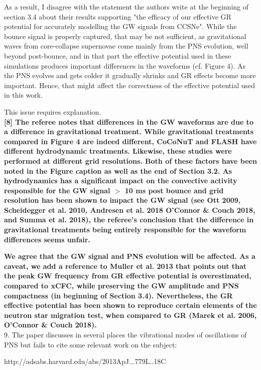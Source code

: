 \documentclass[11pt]{article}
\begin{document}
As a result, I disagree with the statement the authors write at the beginning of 
section 3.4 about their results supporting "the efficacy of our effective GR 
potential for accurately modelling the GW signals from CCSNe". While the bounce signal is properly captured, that may be not sufficient, as gravitational waves from core-collapse supernovae come mainly from the PNS evolution, well beyond post-bounce, and in that part the effective potential used in these simulations produces important differences in the waveforms (cf. Figure 4). As the PNS evolves and gets colder it gradually shrinks and GR effects become more important. Hence, that might affect the correctness of the effective potential used in this work.

This issue requires explanation.\\

\textbf{[8] The referee notes that differences in the GW waveforms are due to a difference in gravitational treatment.  While gravitational treatments compared in Figure 4 are indeed different, CoCoNuT and FLASH have different hydrodynamic treatments.  Likewise, these studies were performed at different grid resolutions.  Both of these factors have been noted in the Figure caption as well as the end of Section 3.2.  As hydrodynamics has a significant impact on the convective activity responsible for the GW signal $>$ 10 ms post bounce and grid resolution has been shown to impact the GW signal (see Ott 2009, Scheidegger et al. 2010, Andresen et al. 2018 O'Connor \& Couch 2018, and Summa et al. 2018), the referee's conclusion that the difference in gravitational treatments being entirely responsible for the waveform differences seems unfair.}

\textbf{We agree that the GW signal and PNS evolution will be affected.  As a caveat, we add a reference to Muller et al. 2013 that points out that the peak GW frequency from GR effective potential is overestimated, compared to xCFC, while preserving the GW amplitude and PNS compactness (in beginning of Section 3.4).  Nevertheless, the GR effective potential has been shown to reproduce certain elements of the neutron star migration test, when compared to GR (Marek et al. 2006, O'Connor \& Couch 2018).}\\

9. The paper discusses in several places the vibrational modes of oscillations of
PNS but fails to cite some relevant work on the subject:

http://adsabs.harvard.edu/abs/2013ApJ...779L..18C
\end{document}
